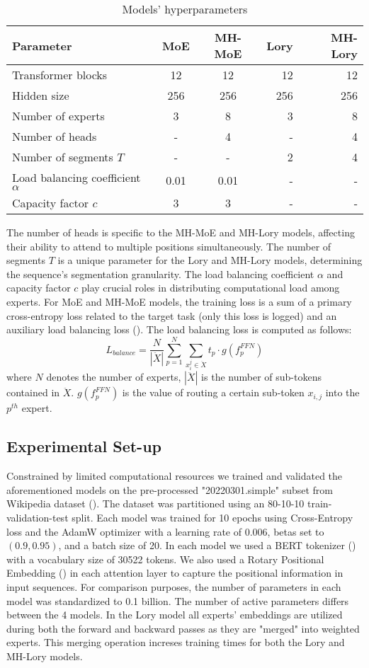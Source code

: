 \documentclass[12pt]{article}
\begin{document}
\begin{table}[h!]
\centering
\begin{tabular}{|l|c|c|r|r|}
\hline
Parameter & \textbf{MoE} & \textbf{MH-MoE} & \textbf{Lory} & \textbf{MH-Lory} \\
\hline
Transformer blocks & 12 & 12 & 12 & 12 \\
Hidden size  & 256 & 256 & 256 & 256 \\
Number of experts& 3 & 8 & 3 & 8 \\

\hline
Number of heads & - & 4 & - & 4 \\
Number of segments $T$ & - & - & 2 & 4 \\
Load balancing coefficient $\alpha$ & 0.01 & 0.01 & - & - \\
Capacity factor $c$ & 3 & 3 & - & - \\
\hline
\end{tabular}
\caption{Models' hyperparameters}
\label{tab:hyperparams_table}
\end{table}
The number of heads is specific to the MH-MoE and MH-Lory models, affecting their ability to attend to multiple positions simultaneously. The number of segments $T$ is a unique parameter for the Lory and MH-Lory models, determining the sequence's segmentation granularity. 
The load balancing coefficient $\alpha$ and capacity factor $c$ play crucial roles in distributing computational load among experts. 
For MoE and MH-MoE models, the training loss is a sum of a primary cross-entropy loss related to the target task (only this loss is logged) and an auxiliary load balancing loss (\cite{wu2024multihead}). The load balancing loss is computed as follows:
\[ L_{balance} = \frac{N}{|\ddot{X}|} \sum_{p=1}^{N} \sum_{x_i^j \in \ddot{X}} t_p \cdot g(f_p^{FFN}) \]
where $N$ denotes the number of experts, $|\ddot{X}|$ is the number of sub-tokens contained in $\ddot{X}$. $g(f_p^{FFN})$ is the value of routing a certain sub-token $x_{i,j}$ into the $p^{th}$ expert.


\subsection{Experimental Set-up}
Constrained by limited computational resources we trained and validated the aforementioned models on the pre-processed "20220301.simple" subset from Wikipedia dataset (\cite{wikidump}).
The dataset was partitioned using an 80-10-10 train-validation-test split. Each model was trained for 10 epochs using Cross-Entropy loss and the AdamW optimizer with a learning rate of $0.006$, betas set to $(0.9, 0.95)$, and a batch size of 20. In each model we used a BERT tokenizer (\cite{devlin2018bert}) with a vocabulary size of 30522 tokens. We also used a Rotary Positional Embedding (\cite{su2024roformer}) in each attention layer to capture the positional information in input sequences. For comparison purposes, the number of parameters in each model was standardized to 0.1 billion. The number of active parameters differs between the 4 models. In the Lory model all experts' embeddings are utilized during both the forward and backward passes as they are "merged" into weighted experts. This merging operation increses training times for both the Lory and MH-Lory models.
\end{document}
